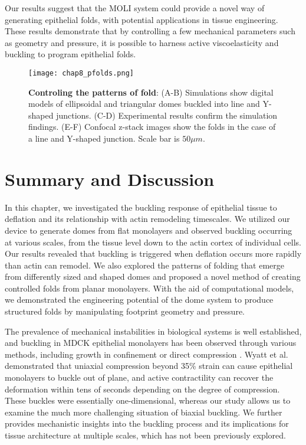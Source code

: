 Our results suggest that the MOLI system could provide a novel way of generating epithelial folds, with potential applications in tissue engineering. These results demonstrate that by controlling a few mechanical parameters such as geometry and pressure, it is possible to harness active viscoelasticity and  buckling to program epithelial folds.

\begin{figure}[h!]
	\centering
	\texttt{[image: chap8\_pfolds.png]}
	\caption{\label{fig_8_7} \textbf{Controling the patterns of fold}: (A-B) Simulations show digital models of ellipsoidal and triangular domes buckled into line and Y-shaped junctions. (C-D) Experimental results confirm the simulation findings. (E-F) Confocal z-stack images show the folds in the case of a line and Y-shaped junction. Scale bar is $50\mu m$.	}
\end{figure}



\hypertarget{summary-and-discussion-1}{%
	\section{Summary and Discussion}\label{summary-and-discussion-1}}

In this chapter, we investigated the buckling response of epithelial tissue to deflation and its relationship with actin remodeling timescales. We utilized our device to generate domes from flat monolayers and observed buckling occurring at various scales, from the tissue level down to the actin cortex of individual cells. Our results revealed that buckling is triggered when deflation occurs more rapidly than actin can remodel. We also explored the patterns of folding that emerge from differently sized and shaped domes and proposed a novel method of creating controlled folds from planar monolayers. With the aid of computational models, we demonstrated the engineering potential of the dome system to produce structured folds by manipulating footprint geometry and pressure.

The prevalence of mechanical instabilities in biological systems is well established, and buckling in MDCK epithelial monolayers has been observed through various methods, including growth in confinement or direct compression \cite{wyatt2020,trushko2020}. Wyatt et al. demonstrated that uniaxial compression beyond 35\% strain can cause epithelial monolayers to buckle out of plane, and active contractility can recover the deformation within tens of seconds depending on the degree of compression. These buckles were essentially one-dimensional, whereas our study allows us to examine the much more challenging situation of biaxial buckling. We further provides mechanistic insights into the buckling process and its implications for tissue architecture at multiple scales, which has not been previously explored. 

